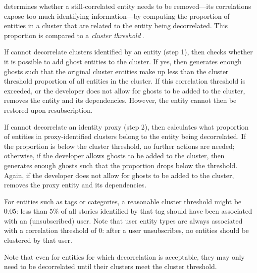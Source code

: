 \sys{} determines whether a still-correlated entity needs to be removed---its correlations expose too much
identifying information---by computing the proportion of entities in a cluster that are related to
the entity being decorrelated. This proportion is compared to a \emph{cluster threshold} .

If \sys{} cannot decorrelate clusters identified by an entity (step 1), then \sys{} checks whether
it is possible to add ghost entities to the cluster. If yes, then \sys{} generates enough ghosts
such that the original cluster entities make up less than the cluster threshold proportion of
all entities in the cluster.  If this correlation threshold is exceeded, or the developer does not
allow for ghosts to be added to the cluster, \sys{} removes the entity and its dependencies.
However, the entity cannot then be restored upon resubscription.

If \sys{} cannot decorrelate an identity proxy (step 2), then \sys{} calculates what proportion of entities 
in proxy-identified clusters belong to the entity being decorrelated. If the proportion is below the
cluster threshold, no further actions are needed; otherwise, if the developer allows ghosts to be
added to the cluster, then \sys{} generates enough ghosts such that the proportion drops below the
threshold. Again, if the developer does not allow for ghosts to be added to the cluster, \sys{}
removes the proxy entity and its dependencies.

For entities such as tags or categories, a reasonable cluster threshold might be 0.05: less than
5\% of all stories identified by that tag should have been associated with an (unsubscribed) user. Note
that user entity types are always associated with a correlation threshold of 0: after a user
unsubscribes, no entities should be clustered by that user.

Note that even for entities for which decorrelation is acceptable, they may only need to be
decorrelated until their clusters meet the cluster threshold.

